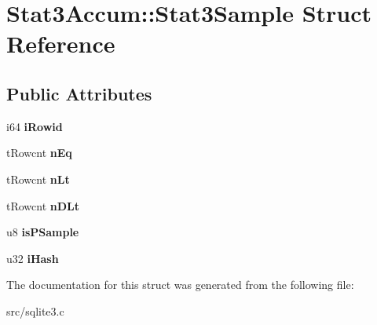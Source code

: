 \hypertarget{struct_stat3_accum_1_1_stat3_sample}{\section{Stat3\-Accum\-:\-:Stat3\-Sample Struct Reference}
\label{struct_stat3_accum_1_1_stat3_sample}
}
\subsection*{Public Attributes}
\begin{DoxyCompactItemize}
\item 
\hypertarget{struct_stat3_accum_1_1_stat3_sample_a5815d8421fb58c864b3d5e42df902e88}{i64 {\bfseries i\-Rowid}}\label{struct_stat3_accum_1_1_stat3_sample_a5815d8421fb58c864b3d5e42df902e88}

\item 
\hypertarget{struct_stat3_accum_1_1_stat3_sample_a91c387125f80023df372d3c4c19616b3}{t\-Rowcnt {\bfseries n\-Eq}}\label{struct_stat3_accum_1_1_stat3_sample_a91c387125f80023df372d3c4c19616b3}

\item 
\hypertarget{struct_stat3_accum_1_1_stat3_sample_aff2cb8657111e4084eea1e10e65938cc}{t\-Rowcnt {\bfseries n\-Lt}}\label{struct_stat3_accum_1_1_stat3_sample_aff2cb8657111e4084eea1e10e65938cc}

\item 
\hypertarget{struct_stat3_accum_1_1_stat3_sample_abc3c2023b9794646be59f695c9b85db2}{t\-Rowcnt {\bfseries n\-D\-Lt}}\label{struct_stat3_accum_1_1_stat3_sample_abc3c2023b9794646be59f695c9b85db2}

\item 
\hypertarget{struct_stat3_accum_1_1_stat3_sample_a48bf958cce34aca54f30b69680558262}{u8 {\bfseries is\-P\-Sample}}\label{struct_stat3_accum_1_1_stat3_sample_a48bf958cce34aca54f30b69680558262}

\item 
\hypertarget{struct_stat3_accum_1_1_stat3_sample_a3f1a7033f005705c0df65db3db626ffb}{u32 {\bfseries i\-Hash}}\label{struct_stat3_accum_1_1_stat3_sample_a3f1a7033f005705c0df65db3db626ffb}

\end{DoxyCompactItemize}


The documentation for this struct was generated from the following file\-:\begin{DoxyCompactItemize}
\item 
src/sqlite3.\-c\end{DoxyCompactItemize}
